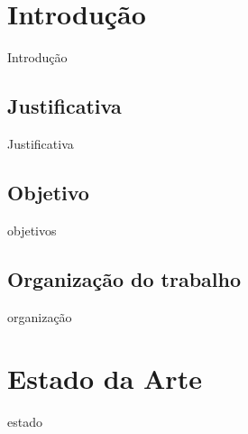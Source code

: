 \documentclass[
    12pt,               %
    openright,          %
    oneside,
    a4paper,            %
    english,            %
    french,             %
    spanish,            %
    brazil              %
    ]{abntex2}
\begin{document}
\tableofcontents*
\cleardoublepage


\textual

\chapter{Introdução}

 Introdução



\section{Justificativa}

Justificativa


\section{Objetivo}

objetivos


\section{Organização do trabalho}

organização


\chapter{Estado da Arte}
estado 

\end{document}
